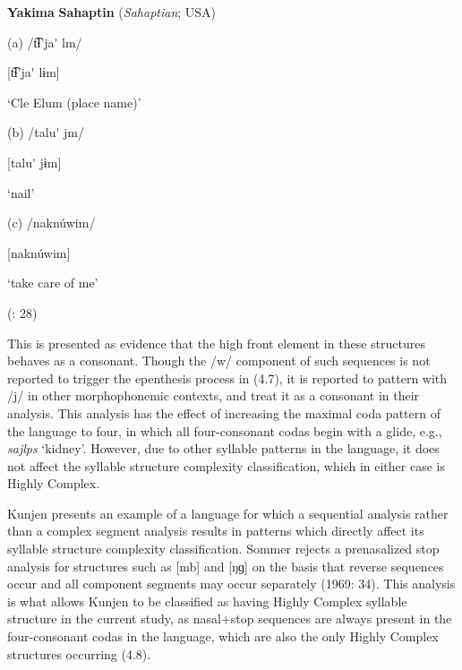 \ea\label{ex:(4.7)}
  \textbf{Yakima} \textbf{Sahaptin} (\textit{Sahaptian}; USA)



(a)  /t͡ɬ’ja\'{} lm/



  [t͡ɬ’ja\'{} lɨm]



  ‘Cle Elum (place name)’



(b)  /talu\'{} jm/



  [talu\'{} jɨm]



  ‘nail’



(c)  /naknúwim/



  [naknúwim]



  ‘take care of me’



(\citealt{HargusBeavert2006}: 28)

\z


This is presented as evidence that the high front element in these structures behaves as a consonant. Though the /w/ component of such sequences is not reported to trigger the epenthesis process in (4.7), it is reported to pattern with /j/ in other morphophonemic contexts, and \citet{HargusBeavert2006} treat it as a consonant in their analysis. This analysis has the effect of increasing the maximal coda pattern of the language to four, in which all four-consonant codas begin with a glide, e.g., \textit{sajlps} ‘kidney’. However, due to other syllable patterns in the language, it does not affect the syllable structure complexity classification, which in either case is Highly Complex.



  Kunjen presents an example of a language for which a sequential analysis rather than a complex segment analysis results in patterns which directly affect its syllable structure complexity classification. Sommer rejects a prenasalized stop analysis for structures such as [mb] and [ŋɡ] on the basis that reverse sequences occur and all component segments may occur separately (1969: 34). This analysis is what allows Kunjen to be classified as having Highly Complex syllable structure in the current study, as nasal+stop sequences are always present in the four-consonant codas in the language, which are also the only Highly Complex structures occurring (4.8).



